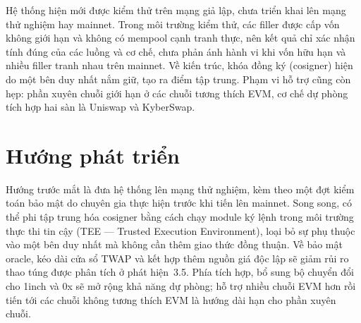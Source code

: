 \documentclass[../DoAn.tex]{subfiles}
\begin{document}
Hệ thống hiện mới được kiểm thử trên mạng giả lập, chưa triển khai lên mạng thử nghiệm hay mainnet. Trong môi trường kiểm thử, các filler được cấp vốn không giới hạn và không có mempool cạnh tranh thực, nên kết quả chỉ xác nhận tính đúng của các luồng và cơ chế, chưa phản ánh hành vi khi vốn hữu hạn và nhiều filler tranh nhau trên mainnet. Về kiến trúc, khóa đồng ký (cosigner) hiện do một bên duy nhất nắm giữ, tạo ra điểm tập trung. Phạm vi hỗ trợ cũng còn hẹp: phần xuyên chuỗi giới hạn ở các chuỗi tương thích EVM, cơ chế dự phòng tích hợp hai sàn là Uniswap và KyberSwap.

\section{Hướng phát triển}
\label{sec:future}

Hướng trước mắt là đưa hệ thống lên mạng thử nghiệm, kèm theo một đợt kiểm toán bảo mật do chuyên gia thực hiện trước khi tiến lên mainnet. Song song, có thể phi tập trung hóa cosigner bằng cách chạy module ký lệnh trong môi trường thực thi tin cậy (TEE --- Trusted Execution Environment), loại bỏ sự phụ thuộc vào một bên duy nhất mà không cần thêm giao thức đồng thuận. Về bảo mật oracle, kéo dài cửa sổ TWAP và kết hợp thêm nguồn giá độc lập sẽ giảm rủi ro thao túng được phân tích ở phát hiện~3.5. Phía tích hợp, bổ sung bộ chuyển đổi cho 1inch và 0x sẽ mở rộng khả năng dự phòng; hỗ trợ nhiều chuỗi EVM hơn rồi tiến tới các chuỗi không tương thích EVM là hướng dài hạn cho phần xuyên chuỗi.
\end{document}
